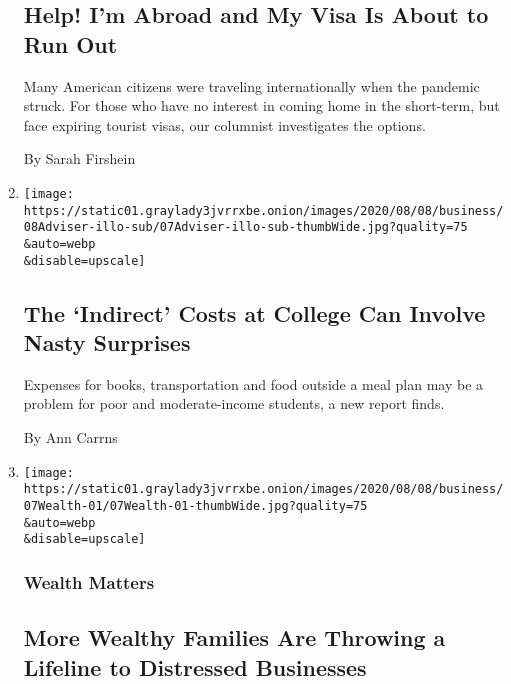 \begin{enumerate}
  \hypertarget{help-im-abroad-and-my-visa-is-about-to-run-out}{%
  \subsection{Help! I'm Abroad and My Visa Is About to Run
  Out}\label{help-im-abroad-and-my-visa-is-about-to-run-out}}

  Many American citizens were traveling internationally when the
  pandemic struck. For those who have no interest in coming home in the
  short-term, but face expiring tourist visas, our columnist
  investigates the options.

  By Sarah Firshein
\item
  \href{/2020/08/07/your-money/college-costs-tuition.html}{}

  \texttt{[image: https://static01.graylady3jvrrxbe.onion/images/2020/08/08/business/08Adviser-illo-sub/07Adviser-illo-sub-thumbWide.jpg?quality=75\\\&auto=webp\\\&disable=upscale]}

  \hypertarget{the-indirect-costs-at-college-can-involve-nasty-surprises}{%
  \subsection{The `Indirect' Costs at College Can Involve Nasty
  Surprises}\label{the-indirect-costs-at-college-can-involve-nasty-surprises}}

  Expenses for books, transportation and food outside a meal plan may be
  a problem for poor and moderate-income students, a new report finds.

  By Ann Carrns
\item
  \href{/2020/08/07/your-money/family-office-direct-investment.html}{}

  \texttt{[image: https://static01.graylady3jvrrxbe.onion/images/2020/08/08/business/07Wealth-01/07Wealth-01-thumbWide.jpg?quality=75\\\&auto=webp\\\&disable=upscale]}

  \hypertarget{wealth-matters-1}{%
  \subsubsection{Wealth Matters}\label{wealth-matters-1}}

  \hypertarget{more-wealthy-families-are-throwing-a-lifeline-to-distressed-businesses}{%
  \subsection{More Wealthy Families Are Throwing a Lifeline to
  Distressed
  Businesses}\label{more-wealthy-families-are-throwing-a-lifeline-to-distressed-businesses}}


\end{enumerate}
